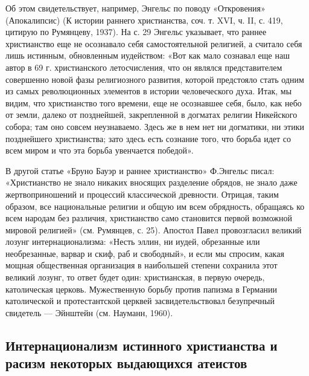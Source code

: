 Об  этом свидетельствует,  например,  Энгельс  по поводу  «Откровения»
(Апокалипсис) (К истории раннего христианства,  соч. т. XVI, ч. II, с.
419,  цитирую по  Румянцеву, 1937).  На с.  29 Энгельс  указывает, что
раннее христианство еще не осознавало себя самостоятельной религией, а
считало  себя лишь  истинным,  обновленным иудейством:  «Вот как  мало
сознавал еще  наш автор  в 69 г.  христианского летосчисления,  что он
являлся  представителем совершенно  новой фазы  религиозного развития,
которой  предстояло стать  одним  из самых  революционных элементов  в
истории  человеческого духа.  Итак,  мы видим,  что христианство  того
времени, еще  не осознавшее себя, было,  как небо от земли,  далеко от
позднейшей, закрепленной в догматах религии Никейского собора; там оно
совсем  неузнаваемо.  Здесь  же  в  нем нет  ни  догматики,  ни  этики
позднейшего христианства;  зато здесь  есть сознание того,  что борьба
идет со всем миром и что эта борьба увенчается победой».

В  другой  статье  «Бруно   Бауэр  и  раннее  христианство»  Ф.Энгельс
писал:  «Христианство не  знало никаких  вносящих разделение  обрядов,
не  знало даже  жертвоприношений и  процессий классической  древности.
Отрицая,  таким образом,  все  национальные религии  и  общую им  всем
обрядность, обращаясь ко всем  народам без различия, христианство само
становится первой  возможной мировой религией» (см.  Румянцев, с. 25).
Апостол  Павел провозгласил  великий лозунг  интернационализма: «Несть
эллин, ни  иудей, обрезанные  или необрезанные, варвар  и скиф,  раб и
свободный», и если мы спросим, какая мощная общественная организация в
наибольшей степени сохранила этот великий лозунг, то ответ будет один:
христианская,  в первую  очередь,  католическая церковь.  Мужественную
борьбу против папизма в Германии католической и протестантской церквей
засвидетельствовал  безупречный свидетель  --- Эйнштейн  (см. Науманн,
1960).

\subsection{Интернационализм истинного христианства и расизм некоторых
выдающихся атеистов}

